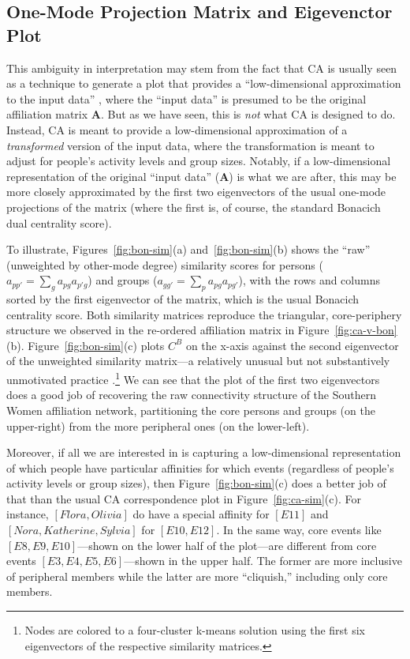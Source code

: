 \documentclass[a4paper,fleqn]{cas-sc}
\begin{document}
\subsection{One-Mode Projection Matrix and Eigevenctor Plot}
This ambiguity in interpretation may stem from the fact that CA is usually seen as a technique to generate a plot that provides a ``low-dimensional approximation to the input data'' \citep[125]{faust2005using}, where the ``input data'' is presumed to be the original affiliation matrix $\mathbf{A}$. But as we have seen, this is \textit{not} what CA is designed to do. Instead, CA is meant to provide a low-dimensional approximation of a \textit{transformed} version of the input data, where the transformation is meant to adjust for people's activity levels and group sizes. Notably, if a low-dimensional representation of the original ``input data'' ($\mathbf{A}$) is what we are after, this may be more closely approximated by the first two eigenvectors of the usual one-mode projections of the matrix (where the first is, of course, the standard Bonacich dual centrality score). 

To illustrate, Figures~\ref{fig:bon-sim}(a) and~\ref{fig:bon-sim}(b) shows the ``raw'' (unweighted by other-mode degree) similarity scores for persons ($a_{pp'} = \sum_g a_{pg}a_{p'g}$) and groups ($a_{gg'} = \sum_p a_{pg}a_{pg'}$), with the rows and columns sorted by the first eigenvector of the matrix, which is the usual Bonacich centrality score. Both similarity matrices reproduce the triangular, core-periphery structure we observed in the re-ordered affiliation matrix in Figure~\ref{fig:ca-v-bon}(b).  Figure~\ref{fig:bon-sim}(c) plots $C^B$ on the x-axis against the second eigenvector of the unweighted similarity matrix---a relatively unusual but not substantively unmotivated practice \citep{iacobucci2017eigenvector}.\footnote{Nodes are colored to a four-cluster k-means solution using the first six eigenvectors of the respective similarity matrices.}  We can see that the plot of the first two eigenvectors does a good job of recovering the raw connectivity structure of the Southern Women affiliation network, partitioning the core persons and groups (on the upper-right) from the more peripheral ones (on the lower-left). 

Moreover, if all we are interested in is capturing a low-dimensional representation of which people have particular affinities for which events (regardless of people's activity levels or group sizes), then Figure~\ref{fig:bon-sim}(c) does a better job of that than the usual CA correspondence plot in Figure~\ref{fig:ca-sim}(c). For instance, $\left[Flora, Olivia\right]$ do have a special affinity for $\left[E11\right]$ and $\left[Nora, Katherine, Sylvia\right]$ for $\left[E10, E12\right]$. In the same way, core events like $\left[E8, E9, E10\right]$---shown on the lower half of the plot---are different from core events $\left[E3, E4, E5, E6\right]$---shown in the upper half. The former are more inclusive of peripheral members while the latter are more ``cliquish,'' including only core members. 
\end{document}
